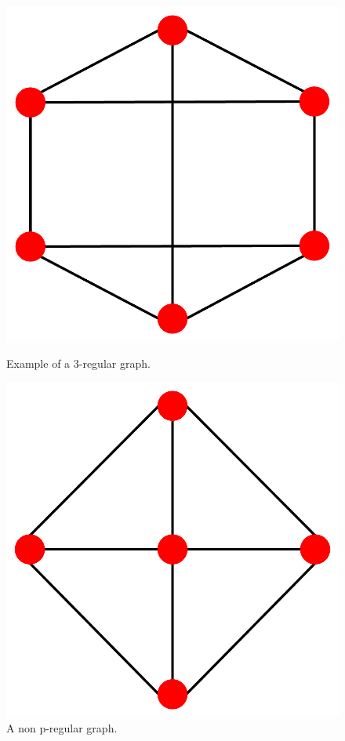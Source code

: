 \documentclass[10pt]{amsart}
\begin{document}
\begin{figure}[h!]
    \begin{minipage}{.5\textwidth}
        \centering
        \includegraphics[scale=.2]{../figures/3-regular_graph.pdf}   
        \caption{Example of a 3-regular graph.}         
    \end{minipage}%
    \begin{minipage}{.5\textwidth}
        \centering
        \includegraphics[scale=.2]{../figures/non-regular_graph.pdf}     
        \caption{A non p-regular graph.}       
    \end{minipage}
\end{figure}
\end{document}
